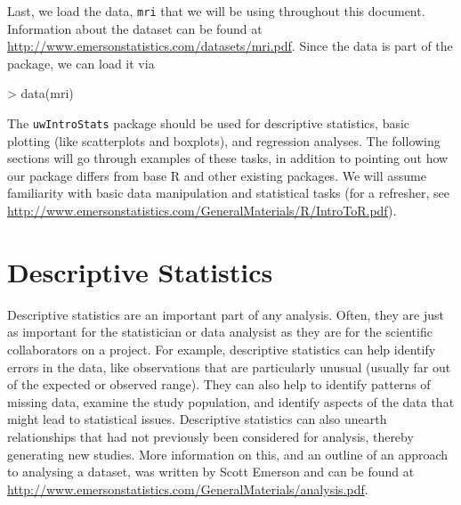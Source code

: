 \documentclass[landscape]{article}
\renewenvironment{Schunk}{\vspace{\topsep}}{\vspace{\topsep}}
\begin{document}
Last, we load the data, \texttt{mri} that we will be using throughout this document. Information about the dataset can be found at \url{http://www.emersonstatistics.com/datasets/mri.pdf}. Since the data is part of the package, we can load it via
\begin{Schunk}
\begin{Sinput}
> data(mri)
\end{Sinput}
\end{Schunk}

The \texttt{uwIntroStats} package should be used for descriptive statistics, basic plotting (like scatterplots and boxplots), and regression analyses. The following sections will go through examples of these tasks, in addition to pointing out how our package differs from base R and other existing packages. We will assume familiarity with basic data manipulation and statistical tasks (for a refresher, see \url{http://www.emersonstatistics.com/GeneralMaterials/R/IntroToR.pdf}).

\section{Descriptive Statistics}
Descriptive statistics are an important part of any analysis. Often, they are just as important for the statistician or data analysist as they are for the scientific collaborators on a project. For example, descriptive statistics can help identify errors in the data, like observations that are particularly unusual (usually far out of the expected or observed range). They can also help to identify patterns of missing data, examine the study population, and identify aspects of the data that might lead to statistical issues. Descriptive statistics can also unearth relationships that had not previously been considered for analysis, thereby generating new studies. More information on this, and an outline of an approach to analysing a dataset, was written by Scott Emerson and can be found at \url{http://www.emersonstatistics.com/GeneralMaterials/analysis.pdf}. 
\end{document}
